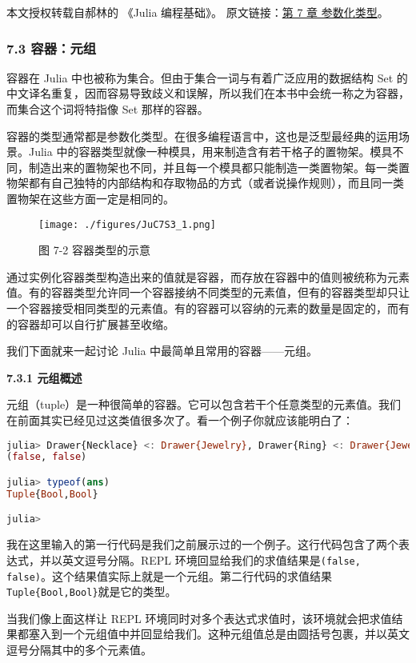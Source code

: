 
本文授权转载自郝林的 《Julia 编程基础》。 原文链接：\href{https://github.com/hyper0x/JuliaBasics/blob/master/book/ch07.md}{第 7 章 参数化类型}。


\subsubsection{7.3 容器：元组}

容器在 Julia 中也被称为集合。但由于集合一词与有着广泛应用的数据结构 Set 的中文译名重复，因而容易导致歧义和误解，所以我们在本书中会统一称之为容器，而集合这个词将特指像 Set 那样的容器。

容器的类型通常都是参数化类型。在很多编程语言中，这也是泛型最经典的运用场景。Julia 中的容器类型就像一种模具，用来制造含有若干格子的置物架。模具不同，制造出来的置物架也不同，并且每一个模具都只能制造一类置物架。每一类置物架都有自己独特的内部结构和存取物品的方式（或者说操作规则），而且同一类置物架在这些方面一定是相同的。
\begin{figure}[ht]
\centering
\texttt{[image: ./figures/JuC7S3\_1.png]}
\caption{图 7-2 容器类型的示意} \label{JuC7S3_fig1}
\end{figure}

通过实例化容器类型构造出来的值就是容器，而存放在容器中的值则被统称为元素值。有的容器类型允许同一个容器接纳不同类型的元素值，但有的容器类型却只让一个容器接受相同类型的元素值。有的容器可以容纳的元素的数量是固定的，而有的容器却可以自行扩展甚至收缩。

我们下面就来一起讨论 Julia 中最简单且常用的容器——元组。

\textbf{7.3.1 元组概述 }

元组（tuple）是一种很简单的容器。它可以包含若干个任意类型的元素值。我们在前面其实已经见过这类值很多次了。看一个例子你就应该能明白了：
\begin{lstlisting}[language=julia]
julia> Drawer{Necklace} <: Drawer{Jewelry}, Drawer{Ring} <: Drawer{Jewelry}
(false, false)

julia> typeof(ans)
Tuple{Bool,Bool}

julia> 
\end{lstlisting}

我在这里输入的第一行代码是我们之前展示过的一个例子。这行代码包含了两个表达式，并以英文逗号分隔。REPL 环境回显给我们的求值结果是\verb|(false, false)|。这个结果值实际上就是一个元组。第二行代码的求值结果\verb|Tuple{Bool,Bool}|就是它的类型。

当我们像上面这样让 REPL 环境同时对多个表达式求值时，该环境就会把求值结果都塞入到一个元组值中并回显给我们。这种元组值总是由圆括号包裹，并以英文逗号分隔其中的多个元素值。

